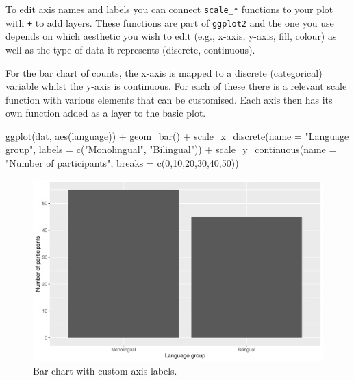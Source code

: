 \documentclass[
  english,
  doc,floatsintext]{apa6}
\newenvironment{Shaded}{\begin{snugshade}}{\end{snugshade}}
\newcommand{\AttributeTok}[1]{\textcolor[rgb]{0.77,0.63,0.00}{#1}}
\newcommand{\DecValTok}[1]{\textcolor[rgb]{0.00,0.00,0.81}{#1}}
\newcommand{\FunctionTok}[1]{\textcolor[rgb]{0.00,0.00,0.00}{#1}}
\newcommand{\NormalTok}[1]{#1}
\newcommand{\SpecialCharTok}[1]{\textcolor[rgb]{0.00,0.00,0.00}{#1}}
\newcommand{\StringTok}[1]{\textcolor[rgb]{0.31,0.60,0.02}{#1}}
\begin{document}
To edit axis names and labels you can connect \texttt{scale\_*} functions to your plot with \texttt{+} to add layers. These functions are part of \texttt{ggplot2} and the one you use depends on which aesthetic you wish to edit (e.g., x-axis, y-axis, fill, colour) as well as the type of data it represents (discrete, continuous).

For the bar chart of counts, the x-axis is mapped to a discrete (categorical) variable whilst the y-axis is continuous. For each of these there is a relevant scale function with various elements that can be customised. Each axis then has its own function added as a layer to the basic plot.

\begin{Shaded}
\begin{Highlighting}[]
\FunctionTok{ggplot}\NormalTok{(dat, }\FunctionTok{aes}\NormalTok{(language)) }\SpecialCharTok{+}
  \FunctionTok{geom\_bar}\NormalTok{() }\SpecialCharTok{+}
  \FunctionTok{scale\_x\_discrete}\NormalTok{(}\AttributeTok{name =} \StringTok{"Language group"}\NormalTok{, }
                   \AttributeTok{labels =} \FunctionTok{c}\NormalTok{(}\StringTok{"Monolingual"}\NormalTok{, }\StringTok{"Bilingual"}\NormalTok{)) }\SpecialCharTok{+}
  \FunctionTok{scale\_y\_continuous}\NormalTok{(}\AttributeTok{name =} \StringTok{"Number of participants"}\NormalTok{,}
                     \AttributeTok{breaks =} \FunctionTok{c}\NormalTok{(}\DecValTok{0}\NormalTok{,}\DecValTok{10}\NormalTok{,}\DecValTok{20}\NormalTok{,}\DecValTok{30}\NormalTok{,}\DecValTok{40}\NormalTok{,}\DecValTok{50}\NormalTok{))}
\end{Highlighting}
\end{Shaded}

\begin{figure}

{\centering \includegraphics[width=1\linewidth]{images/bar3-1} 

}

\caption{Bar chart with custom axis labels.}\label{fig:bar3}
\end{figure}
\end{document}
